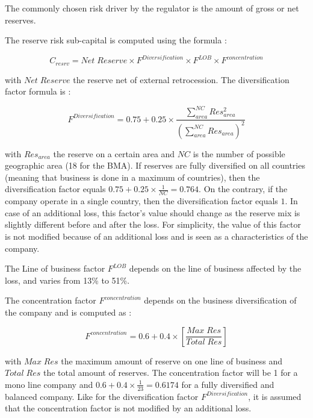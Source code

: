 The commonly chosen risk driver by the regulator is the amount of gross or net reserves.


The reserve risk sub-capital is computed using the formula :

\begin{equation}
	 C_{resrv} =  Net \; Reserve \times F^{Diversification} \times F^{LOB} \times F^{concentration}
\end{equation}

with $Net \; Reserve$ the reserve net of external retrocession. The diversification factor formula is :

\begin{equation}
	F^{Diversification} = 0.75 + 0.25 \times \frac{\sum_{area}^{NC} Res_{area}^2}{(\sum_{area}^{NC} Res_{area})^2}
\end{equation}

with $Res_{area}$ the reserve on a certain area and $NC$ is the number of possible geographic area (18 for the BMA). If reserves are fully diversified on all countries (meaning that business is done in a maximum of countries), then the diversification factor equals $0.75 + 0.25 \times \frac{1}{NC} = 0.764$. On the contrary, if the company operate in a single country, then the diversification factor equals $1$. In case of an additional loss, this factor's value should change as the reserve mix is slightly different before and after the loss. For simplicity, the value of this factor is not modified because of an additional loss and is seen as a characteristics of the company.

The Line of business factor $F^{LOB}$ depends on the line of business affected by the loss, and varies from 13\% to 51\%.

The concentration factor $F^{concentration}$ depends on the business diversification of the company and is computed as :

\begin{equation}
	F^{concentration} = 0.6 + 0.4 \times \left[ \frac{Max \;  Res}{Total\; Res} \right] 
\end{equation}

with $Max \;  Res$ the maximum amount of reserve on one line of business and $Total\; Res$ the total amount of reserves. The concentration factor will be 1 for a mono line company and $0.6 + 0.4 \times \frac{1}{23} = 0.6174$ for a fully diversified and balanced company. Like for the diversification factor $F^{Diversification}$, it is assumed that the concentration factor is not modified by an additional loss.

